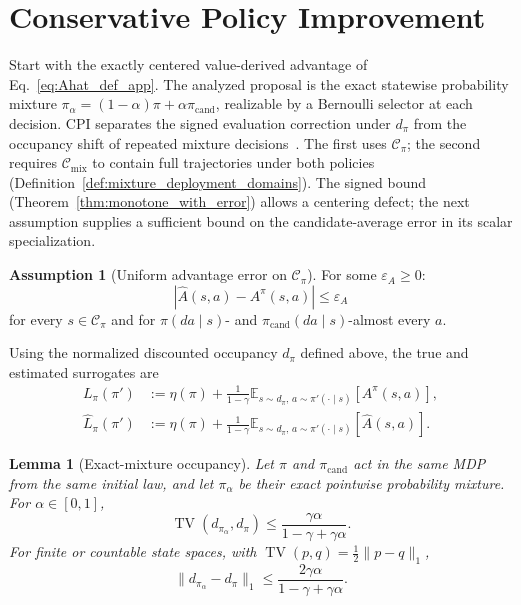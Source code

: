 \documentclass{article}
\theoremstyle{plain}
\newtheorem{lemma}[theorem]{Lemma}
\theoremstyle{definition}
\newtheorem{assumption}[theorem]{Assumption}
\theoremstyle{remark}
\newcommand{\E}{\mathbb{E}}
\begin{document}
\section{Conservative Policy Improvement}
\label{sec:cpi}

Start with the exactly centered value-derived advantage of
Eq.~\eqref{eq:Ahat_def_app}. The analyzed proposal is the exact statewise
probability mixture
$\pi_\alpha=(1-\alpha)\pi+\alpha\pi_{\mathrm{cand}}$, realizable by a
Bernoulli selector at each decision. CPI separates the signed evaluation
correction under $d_\pi$ from the occupancy shift of repeated mixture
decisions~\citep{KakadeLangford2002}. The first uses $\mathcal C_\pi$; the
second requires $\mathcal C_{\mathrm{mix}}$ to contain full trajectories
under both policies (Definition~\ref{def:mixture_deployment_domains}). The
signed bound (Theorem~\ref{thm:monotone_with_error}) allows a centering
defect; the next assumption supplies a sufficient bound on the
candidate-average error in its scalar specialization.

\begin{assumption}[Uniform advantage error on $\mathcal C_\pi$]
\label{ass:Ahat_error_bound}
For some $\varepsilon_A\ge 0$:
\begin{equation}
|\widehat{A}(s,a) - A^\pi(s,a)| \le \varepsilon_A
\end{equation}
for every $s\in\mathcal C_\pi$ and for $\pi(da\mid s)$- and
$\pi_{\mathrm{cand}}(da\mid s)$-almost every $a$.
\end{assumption}

Using the normalized discounted occupancy $d_\pi$ defined above, the true
and estimated surrogates are
\begin{align*}
L_\pi(\pi')
&:=\eta(\pi)+\frac{1}{1-\gamma}
\E_{s\sim d_\pi,\,a\sim\pi'(\cdot\mid s)}[A^\pi(s,a)],\\
\widehat L_\pi(\pi')
&:=\eta(\pi)+\frac{1}{1-\gamma}
\E_{s\sim d_\pi,\,a\sim\pi'(\cdot\mid s)}[\widehat A(s,a)].
\end{align*}

\begin{lemma}[Exact-mixture occupancy]
\label{lem:exact_mixture_occupancy}
Let $\pi$ and $\pi_{\mathrm{cand}}$ act in the same MDP from the same initial
law, and let $\pi_\alpha$ be their exact pointwise probability mixture. For
$\alpha\in[0,1]$,
\begin{equation}
\operatorname{TV}(d_{\pi_\alpha},d_\pi)
\le
\frac{\gamma\alpha}{1-\gamma+\gamma\alpha}.
\label{eq:exact_mixture_occupancy_tv}
\end{equation}
For finite or countable state spaces, with
$\operatorname{TV}(p,q)=\tfrac12\|p-q\|_1$,
\begin{equation}
\|d_{\pi_\alpha}-d_\pi\|_1
\le
\frac{2\gamma\alpha}{1-\gamma+\gamma\alpha}.
\label{eq:exact_mixture_occupancy_l1}
\end{equation}
\end{lemma}
\end{document}
